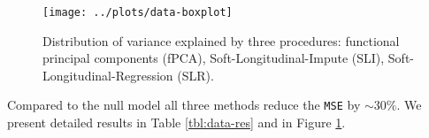 \documentclass[preprint]{imsart}
\numberwithin{equation}{section}
\theoremstyle{plain}
\newcommand{\tr}[1]{{\textcolor{red}{#1}}}
\DeclareMathOperator*{\diag}{diag}
\begin{document}
\begin{figure}[h!]
  \texttt{[image: ../plots/data-boxplot]}
  \caption{Distribution of variance explained by three procedures: functional principal components (fPCA), Soft-Longitudinal-Impute (SLI), Soft-Longitudinal-Regression (SLR).}
  \label{fig:Boxplots}
\end{figure}

Compared to the null model all three methods reduce the \verb|MSE| by $\sim 30\%$. We present detailed results in Table \ref{tbl:data-res} and in Figure \ref{fig:Boxplots}. %





\end{document}
